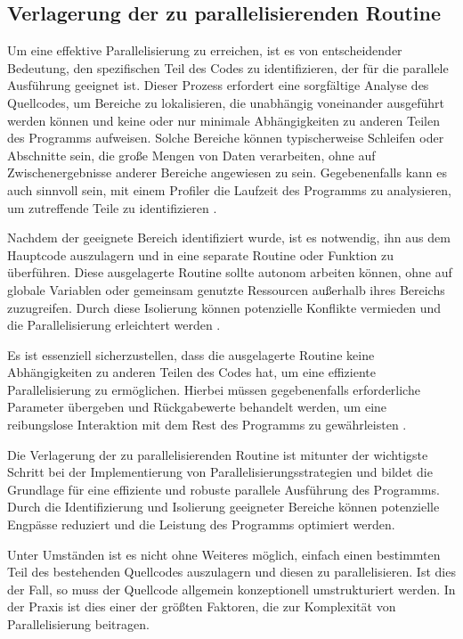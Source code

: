 \subsection{Verlagerung der zu parallelisierenden Routine}
\label{sec:Verlagerung_parallelisierende_Routine}
Um eine effektive Parallelisierung zu erreichen, ist es von entscheidender Bedeutung, den spezifischen Teil des Codes zu identifizieren, der für die parallele Ausführung geeignet ist. Dieser Prozess erfordert eine sorgfältige Analyse des Quellcodes, um Bereiche zu lokalisieren, die unabhängig voneinander ausgeführt werden können und keine oder nur minimale Abhängigkeiten zu anderen Teilen des Programms aufweisen. Solche Bereiche können typischerweise Schleifen oder Abschnitte sein, die große Mengen von Daten verarbeiten, ohne auf Zwischenergebnisse anderer Bereiche angewiesen zu sein. Gegebenenfalls kann es auch sinnvoll sein, mit einem Profiler die Laufzeit des Programms zu analysieren, um zutreffende Teile zu identifizieren \citep{wilkinson2006parallel}.

Nachdem der geeignete Bereich identifiziert wurde, ist es notwendig, ihn aus dem Hauptcode auszulagern und in eine separate Routine oder Funktion zu überführen. Diese ausgelagerte Routine sollte autonom arbeiten können, ohne auf globale Variablen oder gemeinsam genutzte Ressourcen außerhalb ihres Bereichs zuzugreifen. Durch diese Isolierung können potenzielle Konflikte vermieden und die Parallelisierung erleichtert werden \citep{wilkinson2006parallel}.

Es ist essenziell sicherzustellen, dass die ausgelagerte Routine keine Abhängigkeiten zu anderen Teilen des Codes hat, um eine effiziente Parallelisierung zu ermöglichen. Hierbei müssen gegebenenfalls erforderliche Parameter übergeben und Rückgabewerte behandelt werden, um eine reibungslose Interaktion mit dem Rest des Programms zu gewährleisten \citep{wilkinson2006parallel}.

Die Verlagerung der zu parallelisierenden Routine ist mitunter der wichtigste Schritt bei der Implementierung von Parallelisierungsstrategien und bildet die Grundlage für eine effiziente und robuste parallele Ausführung des Programms. Durch die Identifizierung und Isolierung geeigneter Bereiche können potenzielle Engpässe reduziert und die Leistung des Programms optimiert werden.

Unter Umständen ist es nicht ohne Weiteres möglich, einfach einen bestimmten Teil des bestehenden Quellcodes auszulagern und diesen zu parallelisieren. Ist dies der Fall, so muss der Quellcode allgemein konzeptionell umstrukturiert werden. In der Praxis ist dies einer der größten Faktoren, die zur Komplexität von Parallelisierung beitragen.

